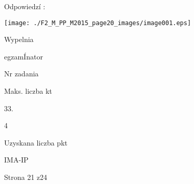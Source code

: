 \documentclass[a4paper,12pt]{article}
\begin{document}
Odpowiedzí :
\begin{center}
\texttt{[image: ./F2\_M\_PP\_M2015\_page20\_images/image001.eps]}
\end{center}
Wypelnia

egzamÍnator

Nr zadania

Maks. liczba kt

33.

4

Uzyskana liczba pkt

IMA-IP

Strona 21 z24
\end{document}
